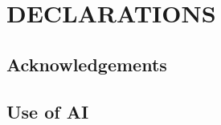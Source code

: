 \section{DECLARATIONS}
\label{sec:declarations}
\subsection{Acknowledgements}

\subsection{Use of AI}
